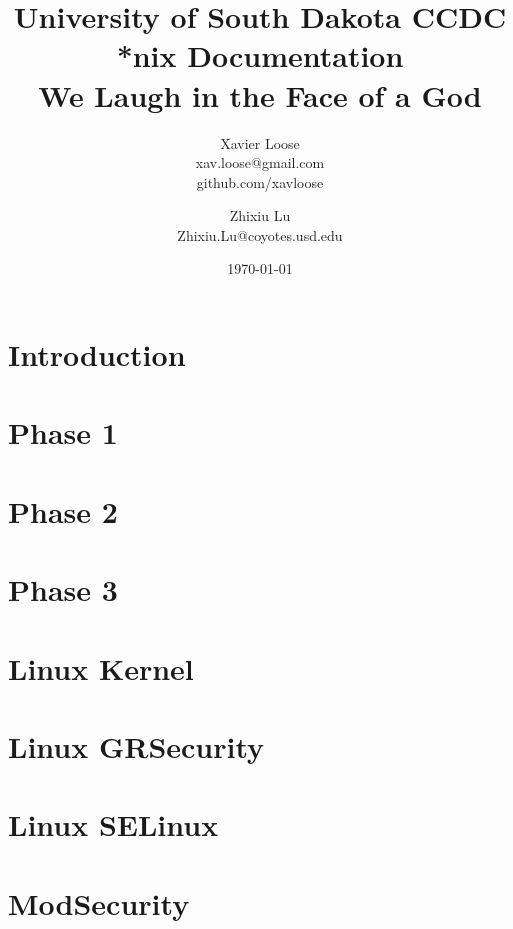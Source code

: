 \documentclass[11pt, letterpaper, oneside, titlepage]{article}
\title{University of South Dakota CCDC *nix Documentation \\\large We Laugh in the Face of a God}
\author{ Xavier Loose \\ xav.loose@gmail.com \\ github.com/xavloose \and Zhixiu Lu \\ Zhixiu.Lu@coyotes.usd.edu }
\date{\today}
\begin{document}
  \maketitle
  \part{Introduction}
    
    
    \newpage
  \part{Phase 1}
    
    \newpage
  \part{Phase 2}
    
    \newpage
  \part{Phase 3}
    
    \newpage
  \part{Linux Kernel}
    
    
    
    \newpage
  \part{Linux GRSecurity}
  \part{Linux SELinux}
  \part{ModSecurity}
    
    \newpage
\end{document}
